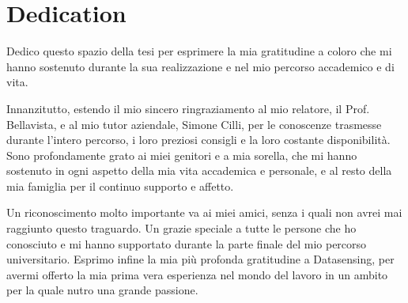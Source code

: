 \chapter*{Dedication}

Dedico questo spazio della tesi per esprimere la mia gratitudine a coloro che mi hanno sostenuto durante la sua realizzazione e nel mio percorso accademico e di vita.

Innanzitutto, estendo il mio sincero ringraziamento al mio relatore, il Prof. Bellavista, e al mio tutor aziendale, Simone Cilli, per le conoscenze trasmesse durante l'intero percorso, i loro preziosi consigli e la loro costante disponibilità.
Sono profondamente grato ai miei genitori e a mia sorella, che mi hanno sostenuto in ogni aspetto della mia vita accademica e personale, e al resto della mia famiglia per il continuo supporto e affetto.

Un riconoscimento molto importante va ai miei amici, senza i quali non avrei mai raggiunto questo traguardo. Un grazie speciale a tutte le persone che ho conosciuto e mi hanno supportato durante la parte finale del mio percorso universitario.
Esprimo infine la mia più profonda gratitudine a Datasensing, per avermi offerto la mia prima vera esperienza nel mondo del lavoro in un ambito per la quale nutro una grande passione.